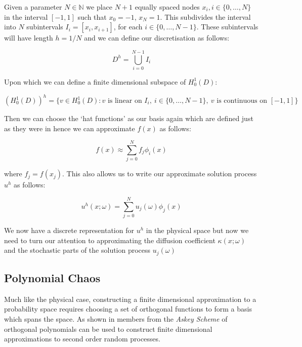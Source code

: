 Given a parameter $N \in \mathbb{N}$ we place $N+1$ equally spaced nodes
$x_i, i \in \{0,\ldots,N\}$ in the interval $[-1,1]$ such that $x_0= -1$,
$x_N = 1$. This subdivides the interval into $N$ subintervals
$I_i = [x_i, x_{i+1}]$, for each $i \in \{0,\ldots,N-1\}$. These subintervals
will have length $h = 1/N$ and we can define our discretisation as follows:

\[
    D^h = \bigcup_{i=0}^{N - 1}I_i
\]

Upon which we can define a finite dimensional subspace of $H^1_0(D)$:

\begin{equation}
    \left(H_0^1(D)\right)^h =
        \{v \in H^1_0(D) : v \text{ is linear on } I_i,\ i \in \{0,\ldots,N-1\},
                        \  v \text{ is continuous on } [-1,1]\}
\end{equation}

Then we can choose the `hat functions' as our basis again which are defined
just as they were in  hence we can approximate $f(x)$
as follows:

\begin{equation}\label{eq:oned-stochastic-f-approx}
    f(x) \approx \sum_{j=0}^Nf_j\phi_i(x)
\end{equation}

where $f_j = f(x_j)$. This also allows us to write our approximate solution
process $u^h$ as follows:

\begin{equation}\label{eq:oned-stochastic-uh}
    u^h(x;\omega) = \sum_{j=0}^Nu_j(\omega)\phi_j(x)
\end{equation}

We now have a discrete representation for $u^h$ in the physical space but now
we need to turn our attention to approximating the diffusion coefficient
$\kappa(x;\omega)$ and the stochastic parts of the solution process
$u_j(\omega)$

\subsection{Polynomial Chaos}

Much like the physical case, constructing a finite dimensional approximation to
a probability space requires choosing a set of orthogonal functions to form a
basis which spans the space. As shown in \cite{gpc} members from the
\textit{Askey Scheme} of orthogonal polynomials can be used to construct finite
dimensional approximations to second order random processes.

